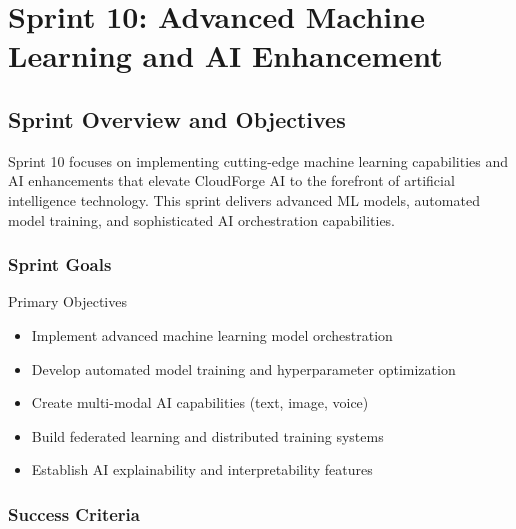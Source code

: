 \chapter{Sprint 10: Advanced Machine Learning and AI Enhancement}

\section{Sprint Overview and Objectives}

Sprint 10 focuses on implementing cutting-edge machine learning capabilities and AI enhancements that elevate CloudForge AI to the forefront of artificial intelligence technology. This sprint delivers advanced ML models, automated model training, and sophisticated AI orchestration capabilities.

\subsection{Sprint Goals}

\begin{sprintbox}{Primary Objectives}
\begin{itemize}
    \item Implement advanced machine learning model orchestration
    \item Develop automated model training and hyperparameter optimization
    \item Create multi-modal AI capabilities (text, image, voice)
    \item Build federated learning and distributed training systems
    \item Establish AI explainability and interpretability features
\end{itemize}
\end{sprintbox}

\subsection{Success Criteria}

